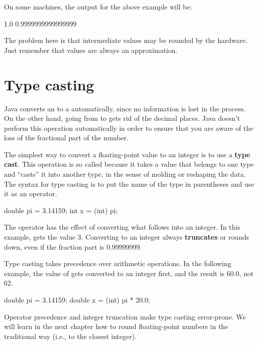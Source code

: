 On some machines, the output for the above example will be:

\begin{stdout}
    1.0
    0.9999999999999999
\end{stdout}

The problem here is that intermediate values may be rounded by the hardware.
Just remember that  values are always an approximation.


\section{Type casting}
\label{rounding}

Java converts an  to a  automatically, since no information is lost in the process.
On the other hand, going from  to  gets rid of the decimal places.
Java doesn't perform this operation automatically in order to ensure that you are aware of the loss of the fractional part of the number.


The simplest way to convert a floating-point value to an integer is to use a {\bf type cast}.
This operation is so called because it takes a value that belongs to one type and ``casts'' it into another type, in the sense of molding or reshaping the data.
The syntax for type casting is to put the name of the type in parentheses and use it as an operator.

\begin{code}
    double pi = 3.14159;
    int x = (int) pi;
\end{code}


The  operator has the effect of converting what follows into an integer.
In this example,  gets the value 3.
Converting to an integer always {\bf truncates} or rounds down, even if the fraction part is 0.99999999.

Type casting takes precedence over arithmetic operations.
In the following example, the value of  gets converted to an integer first, and the result is 60.0, not 62.

\begin{code}
    double pi = 3.14159;
    double x = (int) pi * 20.0;
\end{code}

Operator precedence and integer truncation make type casting error-prone.
We will learn in the next chapter how to round floating-point numbers in the traditional way (i.e., to the closest integer).



